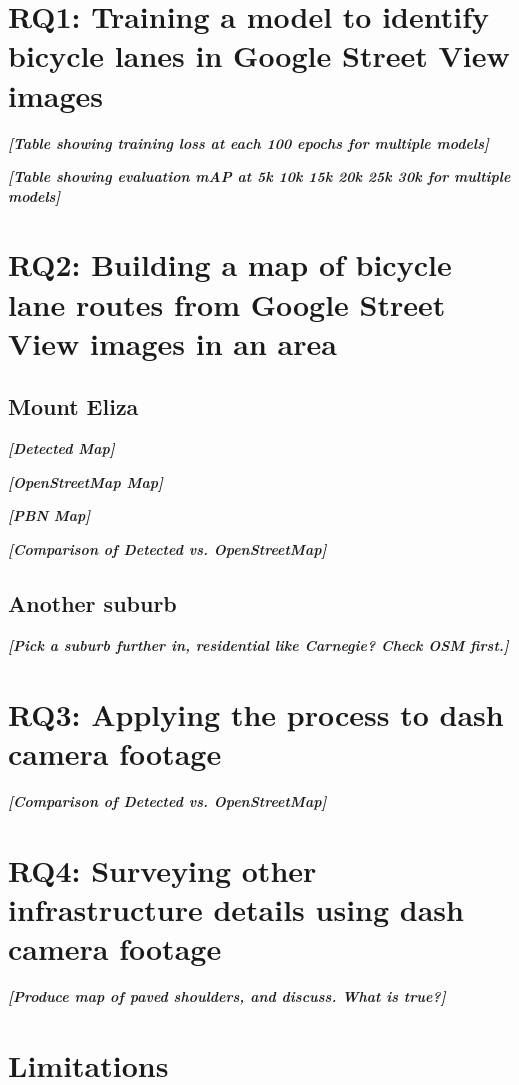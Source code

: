 \documentclass[11pt,twoside]{report}
\newcommand{\remark}[1]{{\bf \em [\marginpar{$\Leftarrow$}#1]}}
\begin{document}
\section{RQ1: Training a model to identify bicycle lanes in Google Street View images}

\remark{Table showing training loss at each 100 epochs for multiple models}

\remark{Table showing evaluation mAP at 5k 10k 15k 20k 25k 30k for multiple models}


\section{RQ2: Building a map of bicycle lane routes from Google Street View images in an area}

\subsection{Mount Eliza}

\remark{Detected Map}

\remark{OpenStreetMap Map}

\remark{PBN Map}

\remark{Comparison of Detected vs. OpenStreetMap}

\subsection{Another suburb}

\remark{Pick a suburb further in, residential like Carnegie?  Check OSM first.}


\section{RQ3: Applying the process to dash camera footage}

\remark{Comparison of Detected vs. OpenStreetMap}


\section{RQ4: Surveying other infrastructure details using dash camera footage}

\remark{Produce map of paved shoulders, and discuss.  What is true?}


\section{Limitations}
\end{document}
